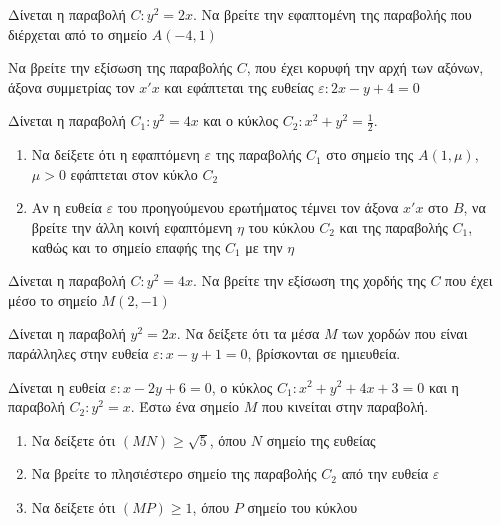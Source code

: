 \documentclass{../../presentation}
\begin{document}
\begin{askisi}
  Δίνεται η παραβολή $C:y^2=2x$. Να βρείτε την εφαπτομένη της παραβολής που διέρχεται από το σημείο $Α(-4,1)$


\end{askisi}

\begin{askisi}
  Να βρείτε την εξίσωση της παραβολής $C$, που έχει κορυφή την αρχή των αξόνων, άξονα συμμετρίας τον $x'x$ και εφάπτεται της ευθείας $ε:2x-y+4=0$


\end{askisi}

\begin{askisi}
  Δίνεται η παραβολή $C_1:y^2=4x$ και ο κύκλος $C_2:x^2+y^2=\frac{1}{2}$.
  \begin{enumerate}
    \item<1-> Να δείξετε ότι η εφαπτόμενη $ε$ της παραβολής $C_1$ στο σημείο της $Α(1,μ)$, $μ>0$ εφάπτεται στον κύκλο $C_2$
    \item<2-> Αν η ευθεία $ε$ του προηγούμενου ερωτήματος τέμνει τον άξονα $x'x$ στο $Β$, να βρείτε την άλλη κοινή εφαπτόμενη $η$ του κύκλου $C_2$ και της παραβολής $C_1$, καθώς και το σημείο επαφής της $C_1$ με την $η$
  \end{enumerate}


\end{askisi}

\begin{askisi}
  Δίνεται η παραβολή $C:y^2=4x$. Να βρείτε την εξίσωση της χορδής της $C$ που έχει μέσο το σημείο $Μ(2,-1)$


\end{askisi}

\begin{askisi}
  Δίνεται η παραβολή $y^2=2x$. Να δείξετε ότι τα μέσα $Μ$ των χορδών που είναι παράλληλες στην ευθεία $ε:x-y+1=0$, βρίσκονται σε ημιευθεία.


\end{askisi}

\begin{askisi}
  Δίνεται η ευθεία $ε:x-2y+6=0$, ο κύκλος $C_1:x^2+y^2+4x+3=0$ και η παραβολή $C_2:y^2=x$. Έστω ένα σημείο $Μ$ που κινείται στην παραβολή.
  \begin{enumerate}
    \item<1-> Να δείξετε ότι $(ΜΝ)\ge \sqrt{5}$, όπου $Ν$ σημείο της ευθείας
    \item<2-> Να βρείτε το πλησιέστερο σημείο της παραβολής $C_2$ από την ευθεία $ε$
    \item<3-> Να δείξετε ότι $(ΜΡ)\ge 1$, όπου $Ρ$ σημείο του κύκλου
  \end{enumerate}


\end{askisi}
\end{document}
